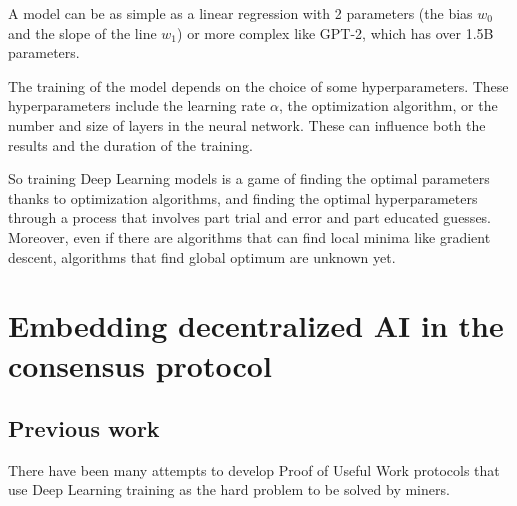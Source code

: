 \documentclass[conference]{IEEEtran}
\begin{document}
A model can be as simple as a linear regression with 2 parameters (the bias $w_0$ and the slope of the line $w_1$) or more complex like GPT-2, which has over 1.5B parameters\cite{b5}.

The training of the model depends on the choice of some hyperparameters. These hyperparameters include the learning rate $\alpha$, the optimization algorithm, or the number and size of layers in the neural network. These can influence both the results and the duration of the training.

So training Deep Learning models is a game of finding the optimal parameters thanks to optimization algorithms, and finding the optimal hyperparameters through a process that involves part trial and error and part educated guesses. Moreover, even if there are algorithms that can find local minima like gradient descent, algorithms that find global optimum are unknown yet.

\section{Embedding decentralized AI in the consensus protocol}
\subsection{Previous work}
There have been many attempts to develop Proof of Useful Work protocols that use Deep Learning training as the hard problem to be solved by miners.
\end{document}
